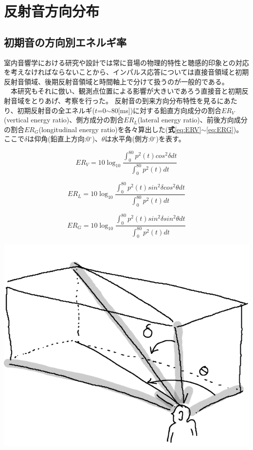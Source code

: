 \chapter{反射音方向分布}

\section{初期音の方向別エネルギ率}
室内音響学における研究や設計では常に音場の物理的特性と聴感的印象との対応を考えなければならないことから、インパルス応答については直接音領域と初期反射音領域、後期反射音領域と時間軸上で分けて扱うのが一般的である。
\\　本研究もそれに倣い、観測点位置による影響が大きいであろう直接音と初期反射音域をとりあげ、考察を行った。
反射音の到来方向分布特性を見るにあたり、初期反射音の全エネルギ($t$=0$\sim$80[ms])に対する鉛直方向成分の割合$ER_V$(vertical energy ratio)、側方成分の割合$ER_L$(lateral energy ratio)、前後方向成分の割合$ER_G$(longitudinal energy ratio)を各々算出した(\textbf{式}\ref{eq:ERV}$\sim$\ref{eq:ERG})。ここで$\delta$は仰角(鉛直上方向:0$^\circ$)、$\theta$は水平角(側方:0$^\circ$)を表す。

\begin{table}[htbp]
\begin{equation}
  \label{eq:ERV}
  ER_V = 10\log_{10}{\frac{\displaystyle\int_0^{80}p^2(t)cos^2{\delta}dt}{\displaystyle\int_0^{80}p^2(t)dt}} 
\end{equation}

\begin{equation}
  \label{eq:ERL}
  ER_L = 10\log_{10}{\frac{\displaystyle\int_0^{80}p^2(t)sin^2{\delta}cos^2{\theta}dt}{\displaystyle\int_0^{80}p^2(t)dt}} 
\end{equation}

\begin{equation}
  \label{eq:ERG}
  ER_G = 10\log_{10}{\frac{\displaystyle\int_0^{80}p^2(t)sin^2{\delta}sin^2{\theta}dt}{\displaystyle\int_0^{80}p^2(t)dt}} 
\end{equation}

\centering
\includegraphics[keepaspectratio,scale=1]{04_att/direction.png}
\label{fig:}
\end{table}

